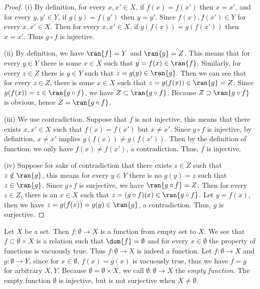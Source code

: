 \begin{proof}
    (i) By definition, for every $x, x' \in X$, if $f(x) = f(x')$ then $x = x'$, and for every $y, y' \in Y$, if $g(y) = f(y')$ then $y = y'$. Since $f(x), f(x') \in Y$ for every $x, x' \in X$. Then for every $x, x' \in X$, if $g(f(x)) = g(f(x'))$ then $x = x'$. Thus $g \circ f$ is injective.

    (ii) By definition, we have $\ran{f} = Y$ and $\ran{g} = Z$. This means that for every $y \in Y$ there is some $x \in X$ such that $y = f(x) \in \ran{f}$. Similarly, for every $z \in Z$ there is $y \in Y$ such that $z = g(y) \in \ran{g}$. Then we can see that for every $z \in Z$, there is some $x \in X$ such that $z = g(f(x)) \in \ran{g} = Z$. Since $g(f(x)) = z \in \ran{g \circ f}$, we have $Z \subset \ran{g \circ f}$. Because $Z \supset \ran{g \circ f}$ is obvious, hence $Z = \ran{g \circ f}$.

    (iii) We use contradiction. Suppose that $f$ is not injective, this means that there exists $x,x' \in X$ such that $f(x) = f(x')$ but $x \neq x'$. Since $g \circ f$ is injective, by definition, $x \neq x'$ implies $g(f(x)) \neq g(f(x'))$. Then by the definition of function, we only have $f(x) \neq f(x')$, a contradiction. Thus, $f$ is injective.

    (iv) Suppose for sake of contradiction that there exists $z \in Z$ such that $z \notin \ran{g}$, this means for every $y \in Y$ there is no $g(y) = z$ such that $z \in \ran{g}$. Since $g \circ f$ is surjective, we have $\ran{g \circ f} = Z$. Then for every $z \in Z$, there is an $x \in X$ such that $z = (g \circ f)(x) \in \ran{g \circ f}$. Let $y = f(x)$, then we have $z = g(f(x)) = g(y) \in \ran{g}$, a contradiction. Thus, $g$ is surjective.
\end{proof}

\begin{example}
    Let $X$ be a set. Then $f : \emptyset \to X$ is a function from empty set to $X$. We see that $f \subset \emptyset \times X$ is a relation such that $\dom{f} = \emptyset$ and for every $x \in \emptyset$ the property of functions is vacuously true. Thus $f : \emptyset \to X$ is indeed a function. Let $f : \emptyset \to X$ and $g : \emptyset \to Y$, since for $x \in \emptyset$, $f(x) = g(x)$ is vacuously true, thus we have $f = g$ for arbitrary $X, Y$. Because $\emptyset = \emptyset \times X$, we call $\emptyset : \emptyset \to X$ the \emph{empty function}. The empty function $\emptyset$ is injective, but is not surjective when $X \neq \emptyset$.
\end{example}

